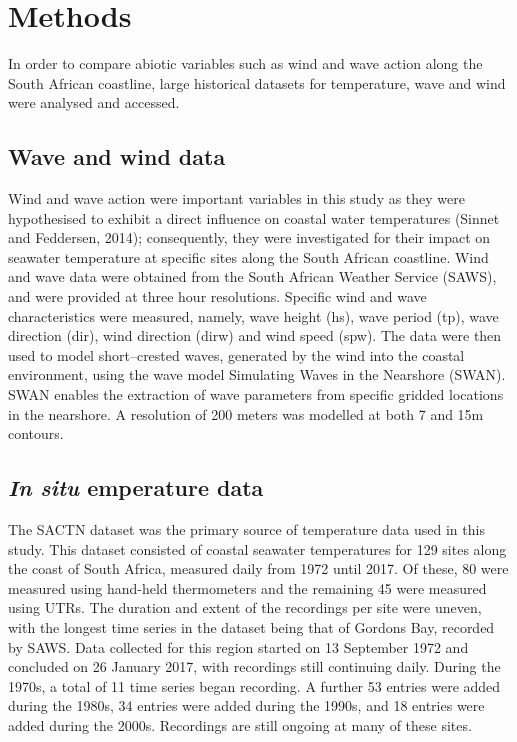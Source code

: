 \documentclass[12pt,a4paper,]{article}
\begin{document}
\hypertarget{methods}{%
\section{Methods}\label{methods}}

In order to compare abiotic variables such as wind and wave action along
the South African coastline, large historical datasets for temperature,
wave and wind were analysed and accessed.

\hypertarget{wave-and-wind-data}{%
\subsection{Wave and wind data}\label{wave-and-wind-data}}

Wind and wave action were important variables in this study as they were
hypothesised to exhibit a direct influence on coastal water temperatures
(Sinnet and Feddersen, 2014); consequently, they were investigated for
their impact on seawater temperature at specific sites along the South
African coastline. Wind and wave data were obtained from the South
African Weather Service (SAWS), and were provided at three hour
resolutions. Specific wind and wave characteristics were measured,
namely, wave height (hs), wave period (tp), wave direction (dir), wind
direction (dirw) and wind speed (spw). The data were then used to model
short--crested waves, generated by the wind into the coastal
environment, using the wave model Simulating Waves in the Nearshore
(SWAN). SWAN enables the extraction of wave parameters from specific
gridded locations in the nearshore. A resolution of 200 meters was
modelled at both 7 and 15m contours.

\hypertarget{in-situ-emperature-data}{%
\subsection{\texorpdfstring{\emph{In situ} emperature
data}{In situ emperature data}}\label{in-situ-emperature-data}}

The SACTN dataset was the primary source of temperature data used in
this study. This dataset consisted of coastal seawater temperatures for
129 sites along the coast of South Africa, measured daily from 1972
until 2017. Of these, 80 were measured using hand-held thermometers and
the remaining 45 were measured using UTRs. The duration and extent of
the recordings per site were uneven, with the longest time series in the
dataset being that of Gordons Bay, recorded by SAWS. Data collected for
this region started on 13 September 1972 and concluded on 26 January
2017, with recordings still continuing daily. During the 1970s, a total
of 11 time series began recording. A further 53 entries were added
during the 1980s, 34 entries were added during the 1990s, and 18 entries
were added during the 2000s. Recordings are still ongoing at many of
these sites.
\end{document}
